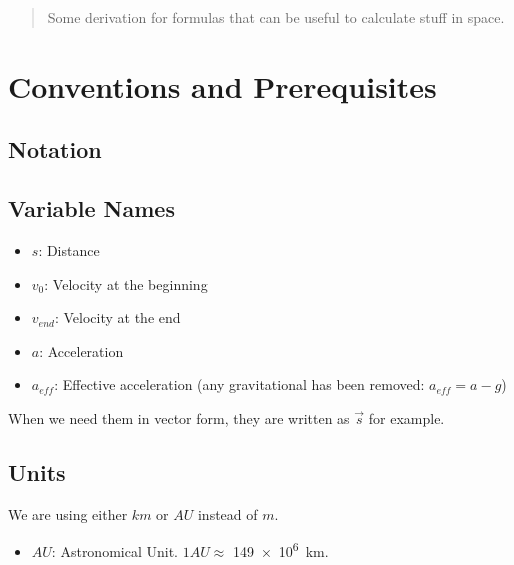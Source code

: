 \documentclass[10pt]{article}
\numberwithin{equation}{section}
\begin{document}
	\newcommand*{\ShowIntersection}[2]{
		\fill 
		[name intersections={of=#1 and #2, name=i, total=\t}] 
		[red, opacity=1, every node/.style={above left, black, opacity=1}] 
		\foreach \s in {1,...,\t}{(i-\s) circle (2pt)
			};
	}
	
	\maketitle
	\newpage
	
	\tableofcontents
	\newpage
	
	\begin{abstract}
		Some derivation for formulas that can be useful to calculate stuff in space.
	\end{abstract}
	
	\section{Conventions and Prerequisites}
	
	\subsection{Notation}
	
	\subsection{Variable Names}
	
	\begin{itemize}
		\item $s$: Distance
		\item $v_0$: Velocity at the beginning
		\item $v_{end}$: Velocity at the end
		\item $a$: Acceleration
		\item $a_{eff}$: Effective acceleration (any gravitational has been removed: $a_{eff} = a - g$)
	\end{itemize}
	
	When we need them in vector form, they are written as $\vec{s}$ for example.
	
	\subsection{Units}
	
	We are using either $km$ or $AU$ instead of $m$.
	
	\begin{itemize}
		\item $AU$: Astronomical Unit. $1 AU \approx$ \SI{149e+6}{\km}.
	\end{itemize}
	
\end{document}
